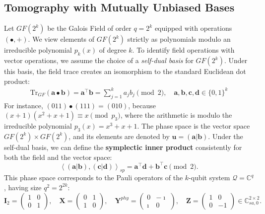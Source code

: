 \documentclass[noinfoline]{imsart}\setcounter{tocdepth}{2}
\renewcommand{\b}[1]{\mathbb{#1}} %
\newcommand{\m}[1]{\mathbf{#1}} %
\renewcommand{\c}[1]{\mathcal{#1}} %
\newcommand{\innpr}[2]{{\left\langle {#1},{#2}\right\rangle}} %
\theoremstyle{plain}
\begin{document}
\begin{appendix}
\subsection{Tomography with Mutually Unbiased Bases}\label{ssec:mub}
Let $GF(2^{k})$ be the Galois Field of order $q=2^{k}$ equipped with operations $(\bullet, +)$. We view elements of $GF(2^k)$ strictly as polynomials modulo an irreducible polynomial $p_{k}(x)$ of degree $k$. To identify field operations with vector operations, we assume the choice of a \emph{self-dual basis} for $GF(2^k)$. Under this basis, the field trace creates an isomorphism to the standard Euclidean dot product:
\begin{align*}
    \text{Tr}_{GF}(\m{a} \bullet \m{b}) = \m{a}^{\top}\m{b} = \sum_{j=1}^{k} a_j b_j \pmod 2, \quad \m{a}, \m{b}, \m{c}, \m{d} \in \{0, 1\}^{k} 
\end{align*}
For instance, $(011) \bullet (111) = (010)$, because $(x+1)(x^{2}+x+1) \equiv x \pmod{p_{3}}$, where the arithmetic is modulo the irreducible polynomial $p_{3}(x)=x^{3}+x+1$.
The phase space is the vector space $GF(2^k) \times GF(2^k)$, and its elements are denoted by $\m{u} = (\m{a} | \m{b})$. Under the self-dual basis, we can define the \textbf{symplectic inner product} consistently for both the field and the vector space: \begin{equation} \innpr{(\m{a}|\m{b})}{(\m{c}|\m{d})}_{sp} = \m{a}^{\top} \m{d} + \m{b}^{\top} \m{c} \pmod 2. \end{equation}
This phase space corresponds to the Pauli operators of the $k$-qubit system $\c{Q} = \b{C}^{q}$, having size $q^{2} = 2^{2k}$:
\begin{equation*}
    \m{I}_{2} = \begin{pmatrix}
        1 &0 \\ 0 &1
    \end{pmatrix}, \quad
    \m{X} = \begin{pmatrix}
        0 &1 \\ 1 &0
    \end{pmatrix}, \quad
    \m{Y}^{phy} = \begin{pmatrix}
        0 &-\imath \\ \imath &0
    \end{pmatrix}, \quad
    \m{Z} = \begin{pmatrix}
        1 &0 \\ 0 &-1
    \end{pmatrix} \in \b{C}_{sa, 0}^{2 \times 2}.
\end{equation*}

\end{appendix}
\end{document}
